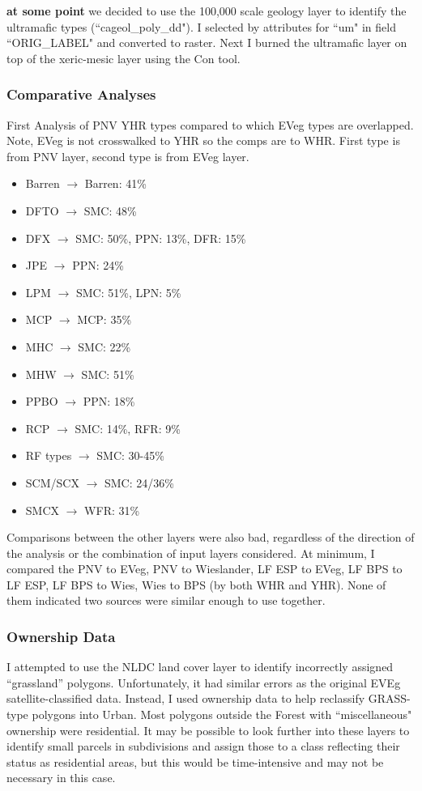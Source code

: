 \textbf{at some point} we decided to use the 100,000 scale geology layer to identify the ultramafic types (``cageol\_poly\_dd"). I selected by attributes for ``um" in field ``ORIG\_LABEL" and converted to raster. Next I burned the ultramafic layer on top of the xeric-mesic layer using the Con tool.

\subsubsection{Comparative Analyses}
First Analysis of PNV YHR types compared to which EVeg types are overlapped. Note, EVeg is not crosswalked to YHR so the comps are to WHR. First type is from PNV layer, second type is from EVeg layer.
\begin{itemize}
\item Barren $\rightarrow$ Barren: 41\%
\item DFTO $\rightarrow$ SMC: 48\%
\item DFX $\rightarrow$ SMC: 50\%, PPN: 13\%, DFR: 15\%
\item JPE $\rightarrow$ PPN: 24\%
\item LPM $\rightarrow$ SMC: 51\%, LPN: 5\%
\item MCP $\rightarrow$ MCP: 35\%
\item MHC $\rightarrow$ SMC: 22\%
\item MHW $\rightarrow$ SMC: 51\%
\item PPBO $\rightarrow$ PPN: 18\%
\item RCP $\rightarrow$ SMC: 14\%, RFR: 9\%
\item RF types $\rightarrow$ SMC: 30-45\%
\item SCM/SCX $\rightarrow$ SMC: 24/36\%
\item SMCX $\rightarrow$ WFR: 31\%
\end{itemize}
Comparisons between the other layers were also bad, regardless of the direction of the analysis or the combination of input layers considered. At minimum, I compared the PNV to EVeg, PNV to Wieslander, LF ESP to EVeg, LF BPS to LF ESP, LF BPS to Wies, Wies to BPS (by both WHR and YHR). None of them indicated two sources were similar enough to use together.

\subsubsection{Ownership Data}
I attempted to use the NLDC land cover layer to identify incorrectly assigned ``grassland'' polygons. Unfortunately, it had similar errors as the original EVEg satellite-classified data. Instead, I used ownership data to help reclassify GRASS-type polygons into Urban. Most polygons outside the Forest with ``miscellaneous" ownership were residential. It may be possible to look further into these layers to identify small parcels in subdivisions and assign those to a class reflecting their status as residential areas, but this would be time-intensive and may not be necessary in this case.

